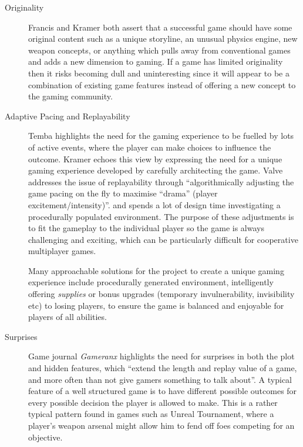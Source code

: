 \begin{description}

\item[Originality] Francis and Kramer both assert that a successful game should have some original content such as a unique storyline, an unusual physics engine, new weapon concepts, or anything which pulls away from conventional games and adds a new dimension to gaming. If a game has limited originality then it risks becoming dull and uninteresting since it will appear to be a combination of existing game features instead of offering a new concept to the gaming community.\cite{tomfrancis} \cite{wolfgangkramer} 

\item[Adaptive Pacing and Replayability] Temba highlights the need for the gaming experience to be fuelled by lots of active events, where the player can make choices to influence the outcome. Kramer echoes this view by expressing the need for a unique gaming experience developed by carefully architecting the game. \cite{antontemba} \cite{wolfgangkramer} Valve addresses the issue of replayability through ``algorithmically adjusting the game pacing on the fly to maximise ``drama'' (player excitement/intensity)''.\cite{valveAI} and spends a lot of design time investigating a procedurally populated environment. The purpose of these adjustments is to fit the gameplay to the individual player so the game is always challenging and exciting, which can be particularly difficult for cooperative multiplayer games.

Many approachable solutions for the project to create a unique gaming experience include procedurally generated environment, intelligently offering \emph{supplies} or bonus upgrades (temporary invulnerability, invisibility etc) to losing players, to ensure the game is balanced and enjoyable for players of all abilities.

\item[Surprises] Game journal \emph{Gameranx} highlights the need for surprises in both the plot and hidden features, which ``extend the length and replay value of a game, and more often than not give gamers something to talk about''.\cite{gameranx} A typical feature of a well structured game is to have different possible outcomes for every possible decision the player is allowed to make. This is a rather typical pattern found in games such as Unreal Tournament, where a player's weapon arsenal might allow him to fend off foes competing for an objective.


\end{description}
